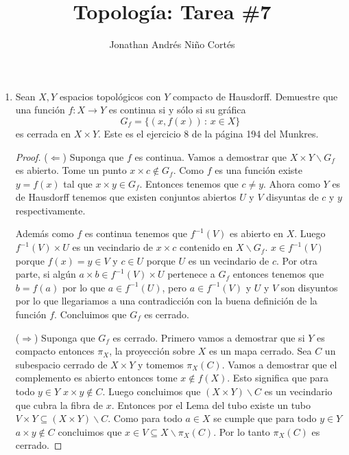 \documentclass[letter,twoside,12pt]{article}
\title{Topología: Tarea \#7}
\author{Jonathan Andrés Niño Cortés}
\begin{document}
\maketitle
\begin{enumerate}
	\item Sean $ X, Y $ espacios topológicos con $ Y $ compacto de Hausdorff. Demuestre que una función $ f: X \to Y $ es continua si y sólo si su gráfica 
	\begin{equation}
	G_f = \{(x,f(x))\,:\,x \in X \} \nonumber
	\end{equation}
	es cerrada en $ X \times Y $. Este es el ejercicio 8 de la página 194 del Munkres.
	\begin{proof}
		($ \Leftarrow $) Suponga que $ f $ es continua. Vamos a demostrar que $X \times Y \backslash G_f $ es abierto. Tome un punto $ x \times c \not \in G_f $. Como $ f $ es una función existe $ y = f(x) $ tal que $ x \times y \in G_f $. Entonces tenemos que $ c \not = y $. Ahora como $ Y $ es de Hausdorff tenemos que existen conjuntos abiertos $ U $ y $ V $ disyuntas de $ c $ y $ y $ respectivamente.
		
		Además como $ f $ es continua tenemos que $ f^{-1}(V) $ es abierto en $ X $. Luego $  f^{-1}(V) \times U $ es un vecindario de $ x \times c $ contenido en $ X \backslash G_f $. $ x \in f^{-1}(V) $ porque $ f(x)=y \in V $ y $ c \in U $ porque $ U $ es un vecindario de $ c $. Por otra parte, si algún $ a \times b \in f^{-1}(V) \times U $ pertenece a $ G_f $ entonces tenemos que $ b = f(a) $ por lo que $ a \in f^{-1}(U) $, pero $ a \in f^{-1}(V) $ y $ U $ y $ V $ son disyuntos por lo que llegariamos a una contradicción con la buena definición de la función $ f $. Concluimos que $ G_f $ es cerrado.
		
		($ \Rightarrow $) Suponga que $ G_f $ es cerrado. Primero vamos a demostrar que si $ Y $ es compacto entonces $ \pi_X $, la proyección sobre $ X $ es un mapa cerrado. Sea $ C $ un subespacio cerrado de $ X \times Y $ y tomemos $ \pi_X(C) $. Vamos a demostrar que el complemento es abierto entonces tome $ x \not  \in f(X) $. Esto significa que para todo $ y \in Y $ $ x \times y \not \in C $. Luego concluimos que $ (X \times Y) \backslash C $ es un vecindario que cubra la fibra de $ x $. Entonces por el Lema del tubo existe un tubo $ V \times Y \subseteq (X \times Y)\backslash C $. Como para todo $ a \in X $ se cumple que para todo $ y \in Y $ $ a \times y \not \in C $ concluimos que $ x \in V \subseteq X \backslash \pi_X(C)$. Por lo tanto $  \pi_X(C) $ es cerrado.
		

\end{proof}
\end{enumerate}
\end{document}
